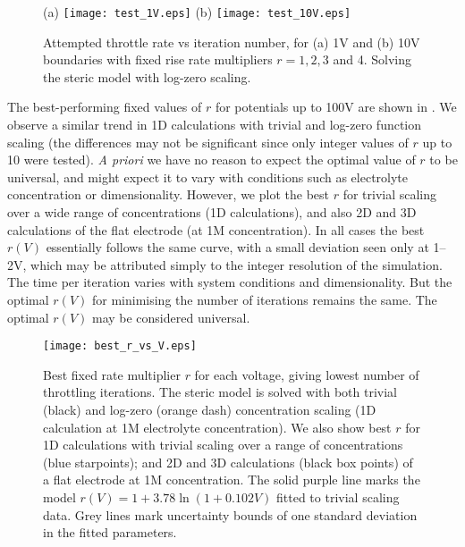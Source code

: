 \begin{figure}
\centering
(a)
\texttt{[image: test\_1V.eps]}
(b)
\texttt{[image: test\_10V.eps]}
\caption{Attempted throttle rate vs iteration number, for (a) 1V and
  (b) 10V  boundaries with fixed rise rate multipliers $r=1,2,3$ and
  4. Solving the steric model with log-zero scaling.
}
\label{fig:throttle_rate}
\end{figure}

The best-performing fixed values of $r$  for potentials up to 100V are shown
in  .  We observe a similar trend in 1D calculations with
trivial and log-zero function scaling  (the
differences may not be significant since only integer values of $r$ up
to 10 were tested). \textit{A priori} we have no reason to expect the
optimal value of $r$ to be universal, and might expect it to vary with
conditions such as electrolyte concentration or
dimensionality. However, we plot the best $r$ for trivial
scaling over  a wide range of concentrations (1D calculations), and
also 2D and 3D calculations of the flat electrode (at 1M
concentration). In all cases the best $r(V)$  essentially follows the
same curve, with a small deviation seen only at 1--2V, which may be attributed simply to the
integer resolution of the simulation.  The time per iteration varies with system conditions and
dimensionality. But the optimal $r(V)$ for minimising the number of
iterations remains the same. The optimal $r(V)$ may be considered universal.



\begin{figure}
\centering
\texttt{[image: best\_r\_vs\_V.eps]}
\caption{Best fixed rate multiplier $r$ for each voltage, giving lowest
  number of throttling iterations. The steric model is solved with both
  trivial (black) and log-zero (orange dash) concentration scaling (1D calculation at 1M
  electrolyte concentration).
  We also show best $r$ for 1D calculations with trivial scaling over a range of
  concentrations (blue starpoints);
  and 2D and 3D calculations (black box points) of a flat electrode at
  1M concentration. The solid purple line marks the model $r(V) = 1 +
  3.78 \ln(1 + 0.102 V)$ fitted to trivial scaling data. Grey lines
  mark uncertainty bounds of one standard deviation in the fitted parameters.
}
\label{fig:best_throttle_rate}
\end{figure}


